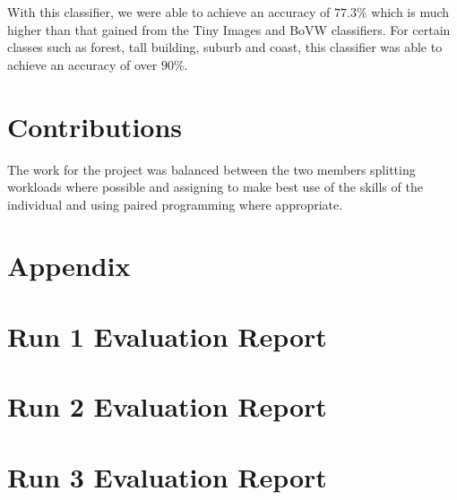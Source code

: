 \documentclass[paper=a4]{article}
\begin{document}
With this classifier, we were able to achieve an accuracy of $77.3\%$ which is much higher than that gained from the Tiny Images and BoVW classifiers. For certain classes such as forest, tall building, suburb and coast, this classifier was able to achieve an accuracy of over $90\%$.

\section{Contributions}

The work for the project was balanced between the two members splitting workloads where possible and assigning to make best use of the skills of the individual and using paired programming where appropriate.

\newpage
\section{Appendix}
\begin{appendix}
\section{Run 1 Evaluation Report}

\newpage
\section{Run 2 Evaluation Report}

\newpage
\section{Run 3 Evaluation Report}

\end{appendix}
\end{document}
